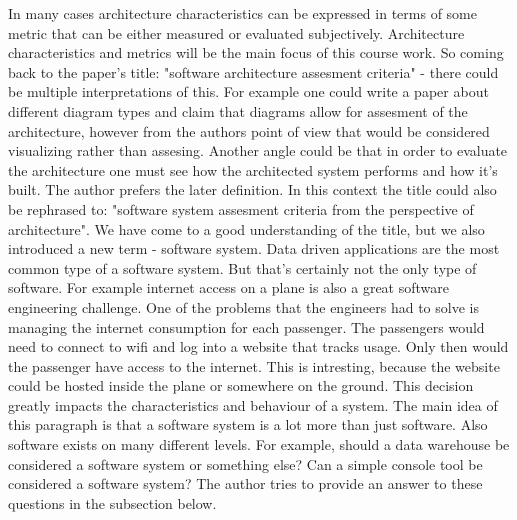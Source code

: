 \documentclass[12pt]{article}
\begin{document}
In many cases architecture characteristics can be expressed in terms of some metric that can be either measured or evaluated subjectively. Architecture characteristics and metrics will be the main focus of this course work. So coming back to the paper's title: "software architecture assesment criteria" - there could be multiple interpretations of this. For example one could write a paper about different diagram types and claim that diagrams allow for assesment of the architecture, however from the authors point of view that would be considered visualizing rather than assesing. Another angle could be that in order to evaluate the architecture one must see how the architected system performs and how it's built. The author prefers the later definition. In this context the title could also be rephrased to: "software system assesment criteria from the perspective of architecture". We have come to a good understanding of the title, but we also introduced a new term - software system. Data driven applications are the most common type of a software system. But that's certainly not the only type of software. For example internet access on a plane is also a great software engineering challenge. One of the problems that the engineers had to solve is managing the internet consumption for each passenger. The passengers would need to connect to wifi and log into a website that tracks usage. Only then would the passenger have access to the internet. This is intresting, because the website could be hosted inside the plane or somewhere on the ground. This decision greatly impacts the characteristics and behaviour of a system. The main idea of this paragraph is that a software system is a lot more than just software. Also software exists on many different levels. For example, should a data warehouse be considered a software system or something else? Can a simple console tool be considered a software system? The author tries to provide an answer to these questions in the subsection below.
\end{document}
